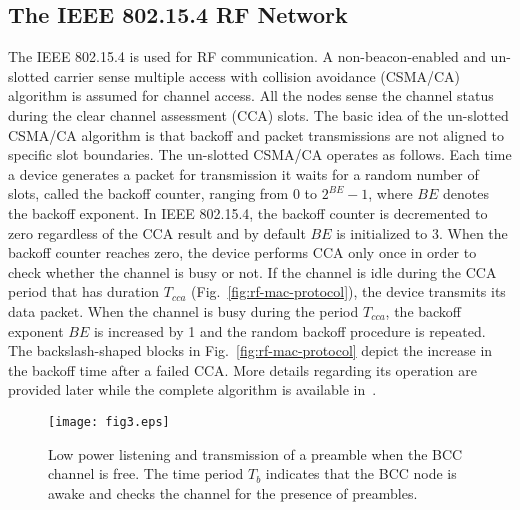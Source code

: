 \documentclass[10pt]{IEEEtran}
\newcounter{section:outage-analysis}
\begin{document}
\subsection{The IEEE 802.15.4 RF Network}
The IEEE 802.15.4 is used for RF communication. A non-beacon-enabled and un-slotted carrier sense multiple access with collision avoidance (CSMA/CA) algorithm is assumed for channel access. All the nodes sense the channel status during the clear channel assessment (CCA) slots. The basic idea of the un-slotted CSMA/CA algorithm is that backoff and packet transmissions are not aligned to specific slot boundaries. The un-slotted CSMA/CA operates as follows. Each time a device generates a packet for transmission it waits for a random number of slots, called the backoff counter, ranging from 0 to $2^{BE}-1$, where $BE$ denotes the backoff exponent. In IEEE 802.15.4, the backoff counter is decremented to zero regardless of the CCA result and by default $BE$ is initialized to 3. When the backoff counter reaches zero, the device performs CCA only once in order to check whether the channel is busy or not. If the channel is idle during the CCA period that has duration $T_{cca}$ (Fig.~\ref{fig:rf-mac-protocol}), the device transmits its data packet. When the channel is busy during the period $T_{cca}$, the backoff exponent $BE$ is increased by 1 and the random backoff procedure is repeated. The backslash-shaped blocks in Fig.~\ref{fig:rf-mac-protocol} depict the increase in the backoff time after a failed CCA. More details regarding its operation are provided later while the complete algorithm is available in~\cite{IEEE-802154}.




\begin{figure}[t]
\begin{center}
\texttt{[image: fig3.eps]}
  \caption{Low power listening and transmission of a preamble when the BCC channel is free. The time period $T_b$ indicates that the BCC node is awake and checks the channel for the presence of preambles.}
  \label{fig:bcc-mac-protocol2}
\end{center}
\end{figure}
\end{document}
